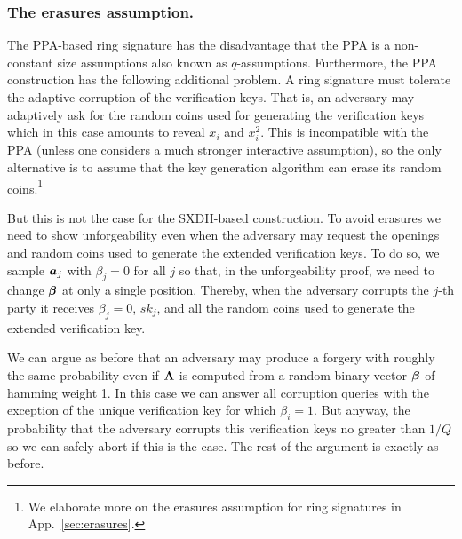 \subsubsection{The erasures assumption.}
The PPA-based ring signature has the disadvantage that the PPA is a non-constant size assumptions also known as $q$-assumptions. Furthermore, the PPA construction has the following additional problem. A ring signature must tolerate the adaptive corruption of the verification keys. That is, an adversary may adaptively ask for the random coins used for generating the verification keys which in this case amounts to reveal $x_i$ and $x_i^2$. This is incompatible with the PPA (unless one considers a much stronger interactive assumption), so the only alternative is to assume that the key generation algorithm can erase its random coins.\footnote{We elaborate more on the erasures assumption for ring signatures in App.~\ref{sec:erasures}.}

But this is not the case for the SXDH-based construction.
To avoid erasures we need to show unforgeability even when the adversary may request the openings and random coins used to generate the extended verification keys. To do so, we sample ${\boldsymbol{a}}_j$ with $\beta_j=0$ for all $j$ so that, in the unforgeability proof, we need to change ${\boldsymbol{\beta}}$ at only a single position. Thereby, when the adversary corrupts the $j$-th party it receives $\beta_j=0$, $sk_j$, and all the random coins used to generate the extended verification key.

We can argue as before that an adversary may produce a forgery
with roughly the same probability even if $\mathbf{{A}}$ is computed from a random binary vector ${\boldsymbol{\beta}}$ of hamming weight 1. In this case we can answer all corruption queries with the exception of the unique verification key for which $\beta_i=1$. But anyway, the probability that the adversary corrupts this verification keys no greater than $1/Q$ so we can safely abort if this is the case. The rest of the argument is exactly as before.


